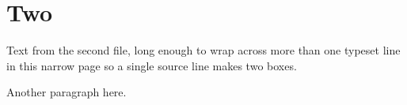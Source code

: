 \section{Two}
Text from the second file, long enough to wrap across more than one typeset
line in this narrow page so a single source line makes two boxes.

Another paragraph here.
